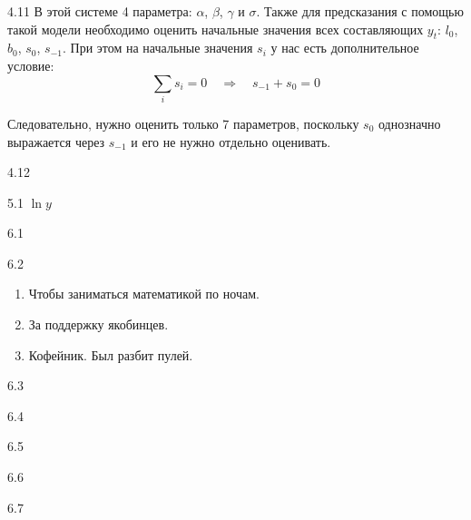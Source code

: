 \begin{solution}{{4.11}}
В этой системе 4 параметра: $\alpha$, $\beta$, $\gamma$ и $\sigma$. Также для предсказания с помощью такой модели необходимо оценить начальные значения всех составляющих $y_t$: $l_0$, $b_0$, $s_0$, $s_{-1}$. При этом на начальные значения $s_i$ у нас есть дополнительное условие:
\[
    \sum_{i} s_i = 0 \quad \Rightarrow \quad s_{-1} + s_0 = 0
\]

Следовательно, нужно оценить только 7 параметров, поскольку $s_0$ однозначно выражается через $s_{-1}$ и его не нужно отдельно оценивать.


\end{solution}
\protect \hypertarget {soln:4.12}{}
\begin{solution}{{4.12}}
\end{solution}
\protect \hypertarget {soln:5.1}{}
\begin{solution}{{5.1}}
  $\ln y$
\end{solution}
\protect \hypertarget {soln:6.1}{}
\begin{solution}{{6.1}}
\end{solution}
\protect \hypertarget {soln:6.2}{}
\begin{solution}{{6.2}}
    \begin{enumerate}
      \item Чтобы заниматься математикой по ночам.
      \item За поддержку якобинцев.
      \item Кофейник. Был разбит пулей.
    \end{enumerate}
\end{solution}
\protect \hypertarget {soln:6.3}{}
\begin{solution}{{6.3}}
  
\end{solution}
\protect \hypertarget {soln:6.4}{}
\begin{solution}{{6.4}}
  
\end{solution}
\protect \hypertarget {soln:6.5}{}
\begin{solution}{{6.5}}
  
\end{solution}
\protect \hypertarget {soln:6.6}{}
\begin{solution}{{6.6}}
  
\end{solution}
\protect \hypertarget {soln:6.7}{}
\begin{solution}{{6.7}}
  
\end{solution}
